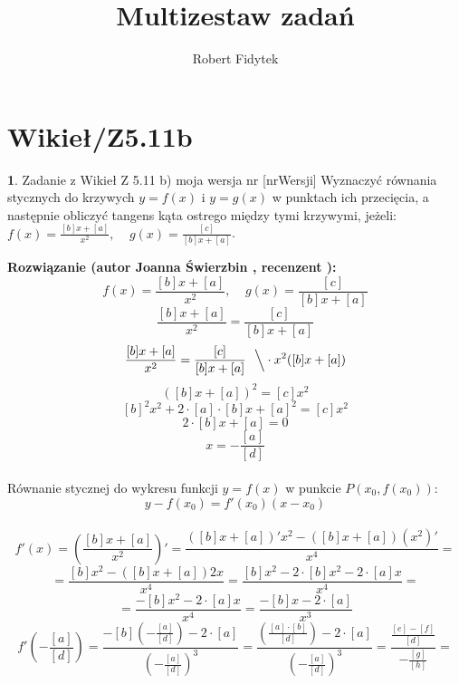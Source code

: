 \documentclass[12pt, a4paper]{article}
\title{Multizestaw zadań}
\author{Robert Fidytek}
\date{}
\theoremstyle{definition} %
\newtheorem{zad}{}
\newcommand{\kategoria}[1]{\section{#1}} %
\newcommand{\zadStart}[1]{\begin{zad}#1\newline} %
\newcommand{\zadStop}{\end{zad}}   %
\newcommand{\rozwStart}[2]{\noindent \textbf{Rozwiązanie (autor #1 , recenzent #2): }\newline} %
\begin{document}
\maketitle


\kategoria{Wikieł/Z5.11b}
\zadStart{Zadanie z Wikieł Z 5.11 b) moja wersja nr [nrWersji]}
Wyznaczyć równania stycznych do krzywych $y=f(x)$ i $y=g(x)$ w punktach ich przecięcia, a następnie obliczyć tangens kąta ostrego między tymi krzywymi, jeżeli:\\
$f(x)=\frac{[b]x+[a]}{x^2}, \ \ \ \ \ g(x)=\frac{[c]}{[b]x+[a]}$.
\zadStop
\rozwStart{Joanna Świerzbin}{}
$$f(x)=\frac{[b]x+[a]}{x^2}, \ \ \ \ \ g(x)=\frac{[c]}{[b]x+[a]}$$
$$\frac{[b]x+[a]}{x^2}=\frac{[c]}{[b]x+[a]}$$
$$\frac{[b]x+[a]}{x^2}=\frac{[c]}{[b]x+[a]} \ \ \Big\backslash \cdot x^2([b]x+[a])$$
$$({[b]x+[a]})^2=[c]x^2$$
$$[b]^2x^2+2\cdot[a]\cdot[b]x+[a]^2=[c]x^2$$
$$2\cdot[b]x+[a]=0$$
$$x=-\frac{[a]}{[d]}$$
\\
Równanie stycznej do wykresu funkcji $y=f(x)$ w punkcie $P(x_0,f(x_0))$:
$$ y-f(x_0)=f'(x_0)(x-x_0)$$
\\
$$f'(x)=\left( \frac{[b]x+[a]}{x^2} \right)'=\frac{([b]x+[a])'x^2-([b]x+[a])(x^2)'}{x^4} = $$
$$ =\frac{[b]x^2-([b]x+[a])2x}{x^4} = \frac{[b]x^2-2\cdot[b]x^2-2\cdot[a]x}{x^4} = $$
$$ = \frac{-[b]x^2-2\cdot[a]x}{x^4} = \frac{-[b]x-2\cdot[a]}{x^3}$$
$$f'\left(-\frac{[a]}{[d]}\right)= \frac{-[b]\left(-\frac{[a]}{[d]}\right)-2\cdot[a]}{\left(-\frac{[a]}{[d]}\right)^3}=
\frac{\left(\frac{[a]\cdot [b]}{[d]}\right)-2\cdot[a]}{\left(-\frac{[a]}{[d]}\right)^3}=\frac{\frac{[e]-[f]}{[d]}}{-\frac{[g]}{[h]}}=$$
\end{document}

